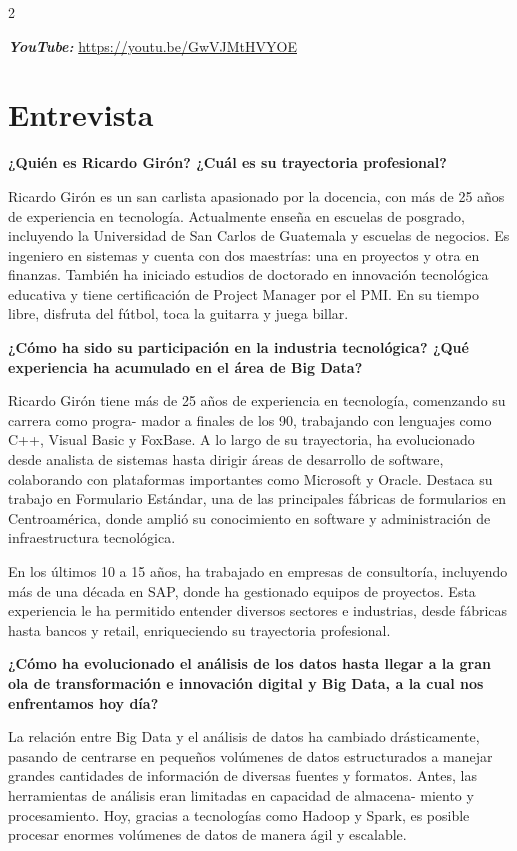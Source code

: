 \documentclass[12pt,spanish,Letterpaper,openany]{book}
\begin{document}
\begin {multicols}{2}

\textbf{\emph{YouTube:}} \url{https://youtu.be/GwVJMtHVYOE}

\hypertarget{entrevista-3}{%
\section{Entrevista}\label{entrevista-3}}

\textbf{¿Quién es Ricardo Girón? ¿Cuál es su trayectoria profesional?}

Ricardo Girón es un san carlista apasionado por la docencia, con más de 25 años de experiencia en tecnología. Actualmente enseña en escuelas de posgrado, incluyendo la Universidad de San Carlos de Guatemala y escuelas de negocios. Es ingeniero en sistemas y cuenta con dos maestrías: una en proyectos y otra en finanzas. También ha iniciado estudios de doctorado en innovación tecnológica educativa y tiene certificación de Project Manager por el PMI. En su tiempo libre, disfruta del fútbol, toca la guitarra y juega billar.

\textbf{¿Cómo ha sido su participación en la industria tecnológica? ¿Qué experiencia ha acumulado en el área de Big Data?}

Ricardo Girón tiene más de 25 años de experiencia en tecnología, comenzando su carrera como progra-
mador a finales de los 90, trabajando con lenguajes como C++, Visual Basic y FoxBase. A lo largo de su trayectoria, ha evolucionado desde analista de sistemas hasta dirigir áreas de desarrollo de software, colaborando con plataformas importantes como Microsoft y Oracle. Destaca su trabajo en Formulario Estándar, una de las principales fábricas de formularios en Centroamérica, donde amplió su conocimiento en software y administración de infraestructura tecnológica.

En los últimos 10 a 15 años, ha trabajado en empresas de consultoría, incluyendo más de una década en SAP, donde ha gestionado equipos de proyectos. Esta experiencia le ha permitido entender diversos sectores e industrias, desde fábricas hasta bancos y retail, enriqueciendo su trayectoria profesional.

\bigskip
\bigskip
\bigskip
\bigskip
\bigskip
\bigskip

\textbf{¿Cómo ha evolucionado el análisis de los datos hasta llegar a la gran ola de transformación e innovación digital y Big Data, a la cual nos enfrentamos hoy día?}

La relación entre Big Data y el análisis de datos ha cambiado drásticamente, pasando de centrarse en pequeños volúmenes de datos estructurados a manejar grandes cantidades de información de diversas fuentes y formatos. Antes, las herramientas de análisis eran limitadas en capacidad de almacena-
miento y procesamiento. Hoy, gracias a tecnologías como Hadoop y Spark, es posible procesar enormes volúmenes de datos de manera ágil y escalable.


\end{multicols}
\end{document}
